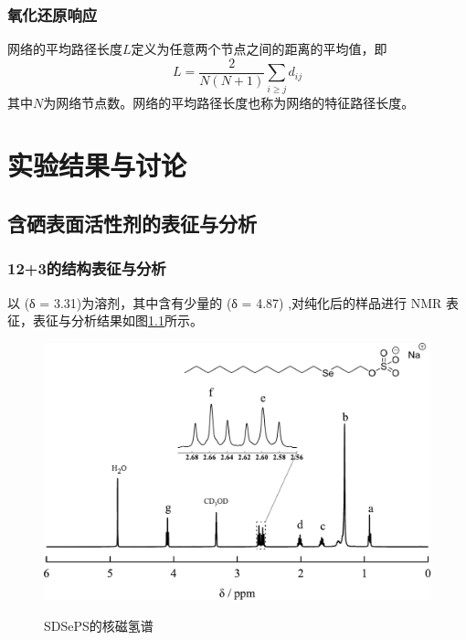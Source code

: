 \documentclass[bachelor,fandolfonts,replaceperiod]{jnuthesis} %
\begin{document}
    \subsection{氧化还原响应}
    
    \begin{definition}[平均路径长度]
        网络的平均路径长度$L$定义为任意两个节点之间的距离的平均值，即
        \begin{equation}\label{eq:avarage_path_lentgh}
        L = \frac{2}{N(N+1)}\sum_{i\geq j}d_{ij}
        \end{equation}
        其中$N$为网络节点数。网络的平均路径长度也称为网络的特征路径长度。
    \end{definition}
    
    \chapter{实验结果与讨论}\label{chapter:results}
    \section{含硒表面活性剂的表征与分析}
    \subsection{12+3的结构表征与分析}
    以 (δ = 3.31)为溶剂，其中含有少量的 (δ = 4.87)\cite{babij2016nmr} ,对纯化后的样品进行
     NMR 表征，表征与分析结果如图\ref{fig:NMR-12+3}所示。
    \begin{figure}[htbp]
        \centering
        \includegraphics[width=.75\textwidth]{figure/nmr123.pdf}\\
        \caption{SDSePS的核磁氢谱}\label{fig:NMR-12+3}
    \end{figure}
     
\end{document}
